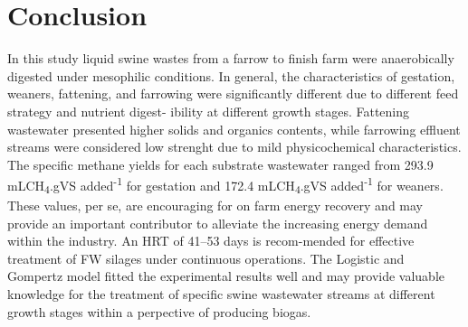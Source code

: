\section{Conclusion}
In this study liquid swine wastes from a farrow to finish farm were anaerobically digested under mesophilic conditions. In general, the characteristics of gestation, weaners, fattening, and farrowing were significantly different due to different feed strategy and nutrient digest- ibility at different growth stages. Fattening wastewater presented higher solids and organics contents, while farrowing effluent streams were considered low strenght due to mild physicochemical characteristics. The specific methane yields for each substrate wastewater ranged from 293.9 mLCH\textsubscript{4}.gVS added\textsuperscript{-1} for gestation and 172.4 mLCH\textsubscript{4}.gVS added\textsuperscript{-1} for weaners. These values, per se, are encouraging for on farm energy recovery and may provide an important contributor to alleviate the increasing energy demand within the industry. An HRT of 41–53 days is recom-mended for effective treatment of FW silages under continuous operations. The Logistic and Gompertz model fitted the experimental results well and may provide valuable knowledge for the treatment of specific swine wastewater streams at different growth stages within a perpective of producing biogas.